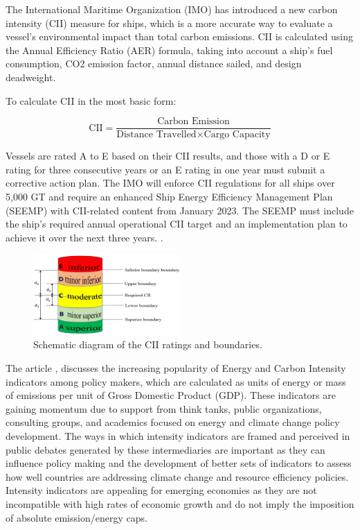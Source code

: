 The International Maritime Organization (IMO) has introduced a new carbon intensity (CII) measure for ships, which is a more accurate way to evaluate a vessel's environmental impact than total carbon emissions.
CII is calculated using the Annual Efficiency Ratio (AER) formula, taking into account a ship's fuel consumption, CO2 emission factor, annual distance sailed, and design deadweight.

To calculate CII in the most basic form:

\begin{equation}
    \text{CII} = \frac{\text{Carbon Emission}}{\text{Distance Travelled} \times \text{Cargo Capacity}}
    \label{eq:cii}
\end{equation}


Vessels are rated A to E based on their CII results, and those with a D or E rating for three consecutive years or an E rating in one year must submit a corrective action plan.
The IMO will enforce CII regulations for all ships over 5,000 GT and require an enhanced Ship Energy Efficiency Management Plan (SEEMP) with CII-related content from January 2023.
The SEEMP must include the ship's required annual operational CII target and an implementation plan to achieve it over the next three years. \autocite{chuah2023implementation}.

\begin{figure}[h]
    \centering
    \includegraphics[width=0.5\textwidth]{images/cii_ratings.jpeg}
    \caption{Schematic diagram of the CII ratings and boundaries. \autocite{tsai2023effects}}
    \label{ciiRating}
\end{figure}


The article \cite{rodriguez2020indicators}, discusses the increasing popularity of Energy and Carbon Intensity indicators among policy makers, which are calculated as units of energy or mass of emissions per unit of Gross Domestic Product (GDP).
These indicators are gaining momentum due to support from think tanks, public organizations, consulting groups, and academics focused on energy and climate change policy development.
The ways in which intensity indicators are framed and perceived in public debates generated by these intermediaries are important as they can influence policy making and the development of better sets of indicators to assess how well countries are addressing climate change and resource efficiency policies.
Intensity indicators are appealing for emerging economies as they are not incompatible with high rates of economic growth and do not imply the imposition of absolute emission/energy caps.


